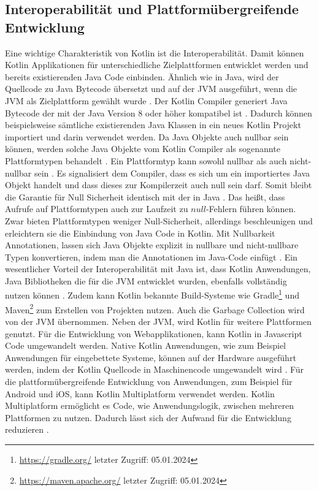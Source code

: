 \documentclass{article}
\begin{document}
\subsection{Interoperabilität und Plattformübergreifende Entwicklung}
Eine wichtige Charakteristik von Kotlin ist die Interoperabilität. Damit können Kotlin Applikationen für unterschiedliche Zielplattformen entwicklet werden und bereits existierenden Java Code einbinden. Ähnlich wie in Java, wird der Quellcode zu Java Bytecode übersetzt und auf der JVM ausgeführt, wenn die JVM als Zielplattform gewählt wurde \cite{KotlinLangDoc}. Der Kotlin Compiler generiert Java Bytecode der mit der Java Version 8 oder höher kompatibel ist \cite{KotlinLangDocFAQ}. Dadurch können beispielsweise sämtliche existierenden Java Klassen in ein neues Kotlin Projekt importiert und darin verwendet werden. Da Java Objekte auch nullbar sein können, werden solche Java Objekte vom Kotlin Compiler als sogenannte Plattformtypen behandelt \cite{Kotlin_In-D}. Ein Plattformtyp kann sowohl nullbar als auch nicht-nullbar sein \cite{Kotlin_In-D}. Es signalisiert dem Compiler, dass es sich um ein importiertes Java Objekt handelt und dass dieses zur Kompilerzeit auch null sein darf. Somit bleibt die Garantie für Null Sicherheit identisch mit der in Java \cite{Kotlin_In-D}. Das heißt, dass Aufrufe auf Plattformtypen auch zur Laufzeit zu $null$-Fehlern führen können. Zwar bieten Plattformtypen weniger Null-Sicherheit, allerdings beschleunigen und erleichtern sie die Einbindung von Java Code in Kotlin. Mit Nullbarkeit Annotationen, lassen sich Java Objekte explizit in nullbare und nicht-nullbare Typen konvertieren, indem man die Annotationen im Java-Code einfügt \cite{Kotlin_In-D}. \newline
Ein wesentlicher Vorteil der Interoperabilität mit Java ist, dass Kotlin Anwendungen, Java Bibliotheken die für die JVM entwicklet wurden, ebenfalls vollständig nutzen können \cite{KotlinLangDoc}. Zudem kann Kotlin bekannte Build-Systeme wie Gradle\footnote{\url{https://gradle.org/} letzter Zugriff: 05.01.2024} und Maven\footnote{\url{https://maven.apache.org/} letzter Zugriff: 05.01.2024} zum Erstellen von Projekten nutzen. Auch die Garbage Collection wird von der JVM übernommen. \cite{KotlinLangDoc} \newline
Neben der JVM, wird Kotlin für weitere Plattformen genutzt. Für die Entwicklung von Webapplikationen, kann Kotlin in Javascript Code umgewandelt werden. Native Kotlin Anwendungen, wie zum Beispiel Anwendungen für eingebettete Systeme, können auf der Hardware ausgeführt werden, indem der Kotlin Quellcode in Maschinencode umgewandelt wird \cite{KotlinLangDocFAQ}. \newline
Für die plattformübergreifende Entwicklung von Anwendungen, zum Beispiel für Android und iOS, kann Kotlin Multiplatform verwendet werden. Kotlin Multiplatform ermöglicht es Code, wie Anwendungslogik, zwischen mehreren Plattformen zu nutzen. Dadurch lässt sich der Aufwand für die Entwicklung reduzieren \cite{KotlinLangDocMulti}.
\end{document}
